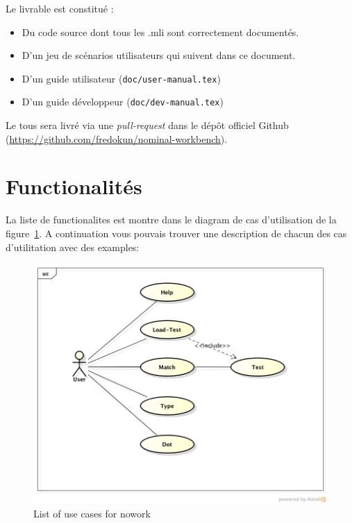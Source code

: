 \documentclass[12pt,a4paper]{article}
\begin{document}
Le livrable est constitué :
\newline

\begin{itemize}
\item Du code source dont tous les .mli sont correctement documentés.
\item D'un jeu de scénarios utilisateurs qui suivent dans ce document.
\item D'un guide utilisateur (\verb=doc/user-manual.tex=)
\item D'un guide développeur (\verb=doc/dev-manual.tex=)
\end{itemize}
\vspace{10pt}

Le tous sera livré via une \textit{pull-request} dans le dépôt officiel Github (\url{https://github.com/fredokun/nominal-workbench}).


\section{Functionalités}

La liste de functionalites est montre dans le diagram de cas
d'utilisation de la figure~\ref{use-cases}. A continuation vous
pouvais trouver une description de chacun des cas d'utilitation avec
des examples:

\begin{figure}[h!]
  \centering
  \includegraphics[width=\linewidth,natwidth=\linewidth,natheight=\textheight]{use-case-diagram.png}
  \caption{List of use cases for nowork}
  \label{use-cases}
\end{figure}
\end{document}
